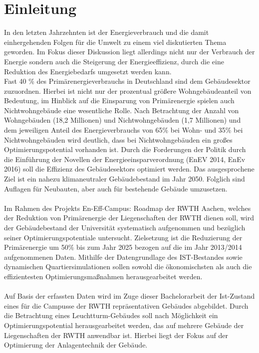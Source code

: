 \chapter{Einleitung}
\label{cha:Einleitung}

In den letzten Jahrzehnten ist der Energieverbrauch und die damit einhergehenden Folgen für die Umwelt zu einem viel diskutierten Thema geworden. Im Fokus dieser Diskussion liegt allerdings nicht nur der Verbrauch der Energie sondern auch die Steigerung der Energieeffizienz, durch die eine Reduktion des Energiebedarfs umgesetzt werden kann.\\
Fast 40 \% des Primärenergieverbrauchs in Deutschland sind dem Gebäudesektor zuzuordnen. Hierbei ist nicht nur der prozentual größere Wohngebäudeanteil von Bedeutung, im Hinblick auf die Einsparung von Primärenergie spielen auch Nichtwohngebäude eine wesentliche Rolle. Nach Betrachtung der Anzahl von Wohngebäuden (18,2 Millionen) und Nichtwohngebäuden (1,7 Millionen) und dem jeweiligen Anteil des Energieverbrauchs von 65\% bei Wohn- und 35\% bei Nichtwohngebäuden wird deutlich, dass bei Nichtwohngebäuden ein großes Optimierungspotential vorhanden ist. Durch die Forderungen der Politik durch die Einführung der Novellen der Energieeinsparverordnung (EnEV 2014, EnEv 2016) soll die Effizienz des Gebäudesektors optimiert werden. Das ausgesprochene Ziel ist ein nahezu klimaneutraler Gebäudebestand im Jahr 2050. Folglich sind Auflagen für Neubauten, aber auch für bestehende Gebäude umzusetzen. \\
\\
Im Rahmen des Projekts En-Eff-Campus: Roadmap der RWTH Aachen, welches der Reduktion von Primärenergie der Liegenschaften der RWTH dienen soll, wird der Gebäudebestand der Universität systematisch aufgenommen und bezüglich seiner Optimierungspotentiale untersucht. Zielsetzung ist die Reduzierung der Primärenergie um 50\% bis zum Jahr 2025 bezogen auf die im Jahr 2013/2014 aufgenommenen Daten. Mithilfe der Datengrundlage des IST-Bestandes sowie dynamischen Quartiersimulationen sollen sowohl die ökonomischsten als auch die effizientesten Optimierungsmaßnahmen herausgearbeitet werden. \\
\\
Auf Basis der erfassten Daten wird im Zuge dieser Bachelorarbeit der Ist-Zustand eines für die Campusse der RWTH repräsentativen Gebäudes abgebildet. Durch die Betrachtung eines Leuchtturm-Gebäudes soll nach Möglichkeit ein Optimierungspotential herausgearbeitet werden, das auf mehrere Gebäude der Liegenschaften der RWTH anwendbar ist. Hierbei liegt der Fokus auf der Optimierung der Anlagentechnik der Gebäude. 


